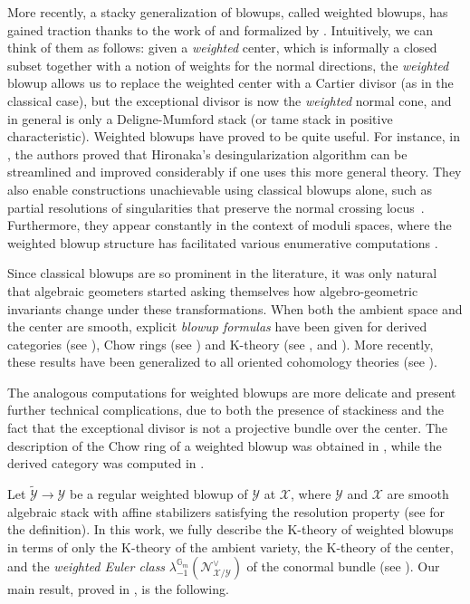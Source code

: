 \documentclass[12pt]{amsart}
\newcommand\Gm{\mathbb{G}_m}
\newcommand{\sN}{\mathscr{N}}
\newcommand{\cX}{\mathcal{X}}
\newcommand{\cY}{\mathcal{Y}}
\theoremstyle{definition}
\begin{document}
More recently, a stacky generalization of blowups, called weighted blowups, has gained traction thanks to the work of \cite{abramovich-temkin-wlodarczyk-weighted-resolution} and formalized by \cite{quek-rydh-weighted-blowup}. Intuitively, we can think of them as follows: given a \emph{weighted} center, which is informally a closed subset together with a notion of weights for the normal directions, the \emph{weighted} blowup allows us to replace the weighted center with a Cartier divisor (as in the classical case), but the exceptional divisor is now the \emph{weighted} normal cone, and in general is only a Deligne-Mumford stack (or tame stack in positive characteristic). Weighted blowups have proved to be quite useful. For instance, in \cite{abramovich-temkin-wlodarczyk-weighted-resolution}, the authors proved that Hironaka's desingularization algorithm can be streamlined and improved considerably if one uses this more general theory. They also enable constructions unachievable using classical blowups alone, such as partial resolutions of singularities that preserve the normal crossing locus~\cite{AT-nc,BDS-B-nc,Wlodarczyk-nc}.
Furthermore, they appear constantly in the context of moduli spaces, where the weighted blowup structure has facilitated various enumerative computations \cite{Inchiostro,canning-oprea-pandharipande,Arena-Obinna,battistella-dilorenzo,arena-song}.

Since classical blowups are so prominent in the literature, it was only natural that algebraic geometers started asking themselves how algebro-geometric invariants change under these transformations. When both the ambient space and the center are smooth, explicit \emph{blowup formulas} have been given for derived categories (see \cite{Orlov}), Chow rings (see \cite[Chapter 6.7]{fulton}) and K-theory (see \cite[Exposé VII]{SGA6}, and \cite{Thomason-blowup}). More recently, these results have been generalized to all oriented cohomology theories (see \cite{orientedcohomology_blowup}).

The analogous computations for weighted blowups are more delicate and present further technical complications, due to both the presence of stackiness and the fact that the exceptional divisor is not a projective bundle over the center. The description of the Chow ring of a weighted blowup was obtained in \cite{Arena-Obinna}, while the derived category was computed in \cite{Li}.

Let $\widetilde{\cY} \to \cY$ be a regular weighted blowup of $\cY$ at $\cX$, where $\cY$ and $\cX$ are smooth algebraic stack with affine stabilizers satisfying the resolution property (see  for the definition). In this work, we fully describe the K-theory of weighted blowups in terms of only the K-theory of the ambient variety, the K-theory of the center, and the \emph{weighted Euler class} $\lambda_{-1}^{\Gm}(\sN^\vee_{\cX/\cY})$ of the conormal bundle (see ). Our main result, proved in , is the following.
\end{document}
